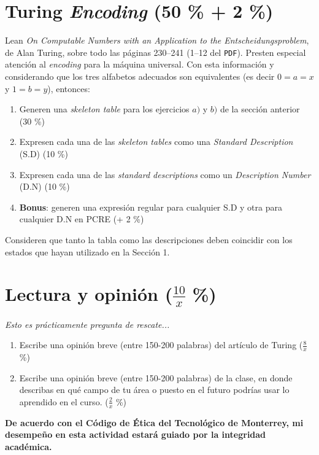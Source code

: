 \documentclass[8pt, onside]{article}
\begin{document}
\section{Turing \textit{Encoding} (50 \% + 2 \%)}

Lean \textit{On Computable Numbers with an Application to the Entscheidungsproblem}, de Alan Turing, sobre todo las páginas 230--241 (1--12 del \texttt{PDF}). Presten especial atención al \textit{encoding} para la máquina universal. Con esta información y considerando que los tres alfabetos adecuados son equivalentes (es decir $0=a=x$ y $1=b=y$), entonces:

\begin{enumerate}[label=\tt \alph*)]
    \item Generen una \textit{skeleton table} para los ejercicios $a)$ y $b)$ de la sección anterior (30 \%)
    \item Expresen cada una de las \textit{skeleton tables} como una \textit{Standard Description} (S.D) (10 \%)
    \item Expresen cada una de las \textit{standard descriptions} como un \textit{Description Number} (D.N) (10 \%)
    \item \textbf{Bonus}: generen una expresión regular para cualquier S.D y otra para cualquier D.N en PCRE (+ 2 \%)
\end{enumerate}

Consideren que tanto la tabla como las descripciones deben coincidir con los estados que hayan utilizado en la Sección 1.

\section{Lectura y opinión ($\frac{10}{x}$ \%)}

{\footnotesize \it Esto es prácticamente pregunta de rescate...}

\begin{enumerate}[label=\tt \alph*)]
    \item Escribe una opinión breve (entre 150-200 palabras) del artículo de Turing ($\frac{8}{x}$ \%)
    \item Escribe una opinión breve (entre 150-200 palabras) de la clase, en donde describas en qué campo de tu área o puesto en el futuro podrías usar lo aprendido en el curso. ($\frac{2}{x}$ \%)
\end{enumerate}

\vfill

\textbf{De acuerdo con el Código de Ética del Tecnológico de Monterrey, mi desempeño en esta actividad estará guiado por la integridad académica.}
\end{document}
